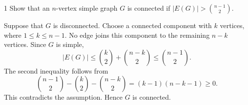\documentclass[11pt,oneside]{article}
\begin{document}

\begin{problem}{1}
Show that an $n$-vertex simple graph $G$ is connected if
$|E(G)|>\binom{n-1}{2}$.
\end{problem}

\begin{solution}
Suppose that $G$ is disconnected. Choose a connected component with $k$ vertices,
where $1\leq k\leq n-1$. No edge joins this component to the remaining
$n-k$ vertices. Since $G$ is simple,
\[
    |E(G)|\leq\binom{k}{2}+\binom{n-k}{2}
    \leq\binom{n-1}{2}.
\]
The second inequality follows from
\[
    \binom{n-1}{2}-\binom{k}{2}-\binom{n-k}{2}
    =(k-1)(n-k-1)\geq0.
\]
This contradicts the assumption. Hence $G$ is connected.
\end{solution}
\end{document}
